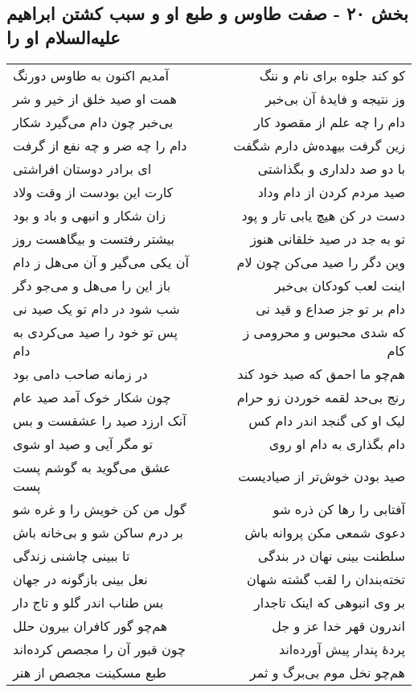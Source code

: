 \begin{center}
\section*{بخش ۲۰ - صفت طاوس و طبع او و سبب کشتن ابراهیم علیه‌السلام او را}
\label{sec:sh020}
\begin{longtable}{l p{0.5cm} r}
آمدیم اکنون به طاوس دورنگ
&&
کو کند جلوه برای نام و ننگ
\\
همت او صید خلق از خیر و شر
&&
وز نتیجه و فایدهٔ آن بی‌خبر
\\
بی‌خبر چون دام می‌گیرد شکار
&&
دام را چه علم از مقصود کار
\\
دام را چه ضر و چه نفع از گرفت
&&
زین گرفت بیهده‌ش دارم شگفت
\\
ای برادر دوستان افراشتی
&&
با دو صد دلداری و بگذاشتی
\\
کارت این بودست از وقت ولاد
&&
صید مردم کردن از دام وداد
\\
زان شکار و انبهی و باد و بود
&&
دست در کن هیچ یابی تار و پود
\\
بیشتر رفتست و بیگاهست روز
&&
تو به جد در صید خلقانی هنوز
\\
آن یکی می‌گیر و آن می‌هل ز دام
&&
وین دگر را صید می‌کن چون لام
\\
باز این را می‌هل و می‌جو دگر
&&
اینت لعب کودکان بی‌خبر
\\
شب شود در دام تو یک صید نی
&&
دام بر تو جز صداع و قید نی
\\
پس تو خود را صید می‌کردی به دام
&&
که شدی محبوس و محرومی ز کام
\\
در زمانه صاحب دامی بود
&&
هم‌چو ما احمق که صید خود کند
\\
چون شکار خوک آمد صید عام
&&
رنج بی‌حد لقمه خوردن زو حرام
\\
آنک ارزد صید را عشقست و بس
&&
لیک او کی گنجد اندر دام کس
\\
تو مگر آیی و صید او شوی
&&
دام بگذاری به دام او روی
\\
عشق می‌گوید به گوشم پست پست
&&
صید بودن خوش‌تر از صیادیست
\\
گول من کن خویش را و غره شو
&&
آفتابی را رها کن ذره شو
\\
بر درم ساکن شو و بی‌خانه باش
&&
دعوی شمعی مکن پروانه باش
\\
تا ببینی چاشنی زندگی
&&
سلطنت بینی نهان در بندگی
\\
نعل بینی بازگونه در جهان
&&
تخته‌بندان را لقب گشته شهان
\\
بس طناب اندر گلو و تاج دار
&&
بر وی انبوهی که اینک تاجدار
\\
هم‌چو گور کافران بیرون حلل
&&
اندرون قهر خدا عز و جل
\\
چون قبور آن را مجصص کرده‌اند
&&
پردهٔ پندار پیش آورده‌اند
\\
طبع مسکینت مجصص از هنر
&&
هم‌چو نخل موم بی‌برگ و ثمر
\\
\end{longtable}
\end{center}
